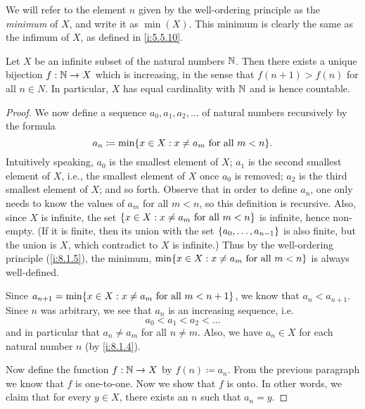 \begin{note}
  We will refer to the element \(n\) given by the well-ordering principle as the \emph{minimum} of \(X\), and write it as \(\min(X)\).
  This minimum is clearly the same as the infimum of \(X\), as defined in \cref{i:5.5.10}.
\end{note}

\begin{prop}\label{i:8.1.5}
  Let \(X\) be an infinite subset of the natural numbers \(\mathbb{N}\).
  Then there exists a unique bijection \(f : \mathbb{N} \to X\) which is increasing, in the sense that \(f(n + 1) > f(n)\) for all \(n \in N\).
  In particular, \(X\) has equal cardinality with \(\mathbb{N}\) and is hence countable.
\end{prop}

\begin{proof}
  We now define a sequence \(a_0, a_1, a_2, \dots\) of natural numbers recursively by the formula
  \[
    a_n \coloneqq \min\set{x \in X : x \neq a_m \text{ for all } m < n}.
  \]
  Intuitively speaking, \(a_0\) is the smallest element of \(X\);
  \(a_1\) is the second smallest element of \(X\), i.e., the smallest element of \(X\) once \(a_0\) is removed;
  \(a_2\) is the third smallest element of \(X\);
  and so forth.
  Observe that in order to define \(a_n\), one only needs to know the values of \(a_m\) for all \(m < n\), so this definition is recursive.
  Also, since \(X\) is infinite, the set \(\left\lbrace x \in X : x \neq a_m \text{ for all } m < n\right\rbrace\) is infinite, hence non-empty.
  (If it is finite, then its union with the set \(\left\lbrace a_0, \dots, a_{n - 1}\right\rbrace\) is also finite, but the union is \(X\), which contradict to \(X\) is infinite.)
  Thus by the well-ordering principle (\cref{i:8.1.5}), the minimum, \(\min\set{x \in X : x \neq a_m \text{ for all } m < n}\) is always well-defined.

  Since \(a_{n + 1} = \min\set{x \in X : x \neq a_m \text{ for all } m < n + 1}\), we know that \(a_n < a_{n + 1}\).
  Since \(n\) was arbitrary, we see that \(a_n\) is an increasing sequence, i.e.
  \[
    a_0 < a_1 < a_2 < \dots
  \]
  and in particular that \(a_n \neq a_m\) for all \(n \neq m\).
  Also, we have \(a_n \in X\) for each natural number \(n\) (by \cref{i:8.1.4}).

  Now define the function \(f : \mathbb{N} \to X\) by \(f(n) \coloneqq a_n\).
  From the previous paragraph we know that \(f\) is one-to-one.
  Now we show that \(f\) is onto.
  In other words, we claim that for every \(y \in X\), there exists an \(n\) such that \(a_n = y\).


\end{proof}
